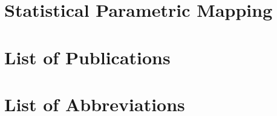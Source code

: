 \documentclass[12pt,a4paper,twoside]{report}
\newcommand\chng[1]{{\color{darkgreen}#1}}
\begin{document}
\clearpage
\section{Statistical Parametric Mapping}\label{cpt:spm1d}


\clearpage
\section{\chng{List of Publications}}\label{cpt:publications}



\clearpage
\section{List of Abbreviations}\label{abbreviations}
\begin{spacing}{1.5}

\end{spacing}


% 
\end{document}
